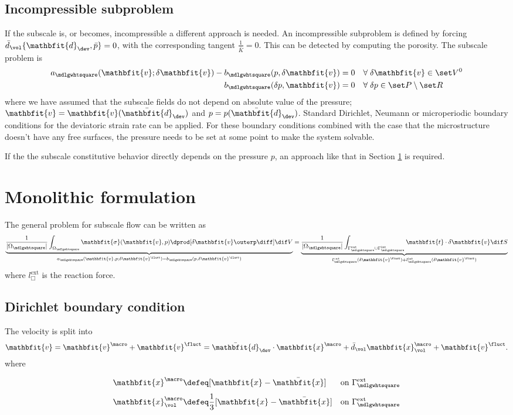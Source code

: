 \documentclass[a4paper,11pt]{article}
\renewcommand{\ta}[1]{\mathbfit{#1}}
\renewcommand{\ts}[1]{\mathbfit{#1}}
\renewcommand{\Box}{\mdlgwhtsquare}
\newcommand{\internal}{\mathrm{int}}
\newcommand{\external}{\mathrm{ext}}
\begin{document}
\subsection{Incompressible subproblem} \label{sec:nested_incompressible}
If the subscale is, or becomes, incompressible a different approach is needed.
An incompressible subproblem is defined by forcing $\bar{d}_\vol\{\ts d_\dev,\bar{p}\} = 0$, with the corresponding tangent $\frac{1}{\bar{K}} = 0$.
This can be detected by computing the porosity.
The subscale problem is
\begin{align}
 a_\Box(\ta v; \delta\ta v) - b_\Box(p,\delta\ta v) &= 0\quad \forall\;\delta\ta v \in \set V^0 \\
 b_\Box(\delta p, \ta v) &= 0\quad \forall\;\delta p \in \set P\setminus\set R
\end{align}
where we have assumed that the subscale fields do not depend on absolute value of the pressure; $\ta v = \ta v(\bar{\ts d}_\dev)$ and $p = p(\bar{\ts d}_\dev)$.
Standard Dirichlet, Neumann  or microperiodic boundary conditions for the deviatoric strain rate can be applied.
For these boundary conditions combined with the case that the microstructure doesn't have any free surfaces, 
the pressure needs to be set at some point to make the system solvable.

If the the subscale constitutive behavior directly depends on the pressure $p$, an approach like that in Section \ref{sec:monolithic} is required.

\section{Monolithic formulation} \label{sec:monolithic}
The general problem for subscale flow can be written as
\begin{align}
 \underbrace{\frac{1}{|\Omega_\Box|} \int_{\Omega_\Box} \ts\sigma(\ta v, p)\dprod [\delta\ta v\outerp\diff] \dif V}_{a_\Box(\ta v,p;\delta\ta v^\fluct)-b_\Box(p,\delta\ta v^\fluct)}
	= \underbrace{\frac{1}{|\Omega_\Box|} \int_{\Gamma_\Box^\external \cup \Gamma_\Box^\internal} \ta t\cdot \delta\ta v\dif S}_{l_\Box^\external(\delta\ta v^\fluct)+l_\Box^\internal(\delta \ta v^\fluct)}
 \label{eq:subscale_original}
\end{align}
where $l_\Box^\external$ is the reaction force.
\subsection{Dirichlet boundary condition}
The velocity is split into
\begin{align}
 \ta v = \ta v^\macro + \ta v^\fluct = \bar{\ts d}_\dev \cdot \ta x^\macro + \bar{d}_\vol \ta x_\vol^\macro + \ta v^\fluct.
\end{align}
where
\begin{align}
 \ta x^\macro \defeq& [\ta x - \bar{\ta x}]\phantom{\frac13} \quad\text{on } \Gamma_\Box^\external
 \label{eq:basefunction}
\\
\ta x_\vol^\macro \defeq & \frac13[\ta x - \bar{\ta x}] \quad\text{on } \Gamma_\Box^\external
 \label{eq:basefunction_vol}
\end{align}
 
\end{document}
